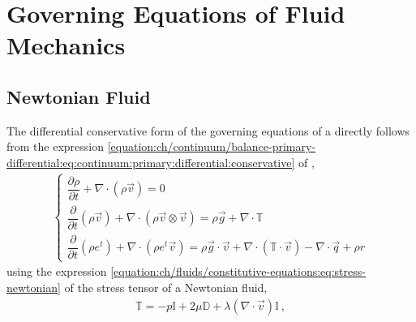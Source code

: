 \documentclass[letterpaper,10pt,english]{jupyterBook}
\begin{document}
\sphinxstepscope


\chapter{Governing Equations of Fluid Mechanics}
\label{\detokenize{ch/fluids/governing-equations:governing-equations-of-fluid-mechanics}}\label{\detokenize{ch/fluids/governing-equations:fluid-mechanics-governing-equations}}\label{\detokenize{ch/fluids/governing-equations::doc}}

\section{Newtonian Fluid}
\label{\detokenize{ch/fluids/governing-equations:newtonian-fluid}}
\sphinxAtStartPar
The differential conservative form of the governing equations of a {\hyperref[\detokenize{ch/fluids/constitutive-equations:fluid-mechanics-constutive-equations-newtonian}]{}} directly follows from the expression \eqref{equation:ch/continuum/balance-primary-differential:eq:continuum:primary:differential:conservative} of {\hyperref[\detokenize{ch/continuum/balance-derived-differential:continuum-governing-equations-primary-integral}]{}},
\begin{equation*}
\begin{split}\begin{cases}
  \dfrac{\partial \rho }{\partial t} + \nabla \cdot \left( \rho \vec{v} \right) = 0 \\
  \dfrac{\partial }{\partial t} \left( \rho \vec{v} \right) +  \nabla \cdot \left( \rho \vec{v} \otimes \vec{v} \right) = \rho \vec{g} + \nabla \cdot \mathbb{T} \\
  \dfrac{\partial}{\partial t}  \left( \rho e^t \right) + \nabla \cdot \left( \rho e^t \vec{v} \right) = \rho \vec{g} \cdot \vec{v} + \nabla \cdot \left( \mathbb{T} \cdot \vec{v} \right) - \nabla \cdot \vec{q} + \rho r
\end{cases}\end{split}
\end{equation*}
\sphinxAtStartPar
using the expression \eqref{equation:ch/fluids/constitutive-equations:eq:stress-newtonian} of the stress tensor of a Newtonian fluid,
\begin{equation*}
\begin{split}\mathbb{T} = - p \mathbb{I} + 2 \mu \mathbb{D} + \lambda (\nabla \cdot \vec{v}) \mathbb{I} \ ,\end{split}
\end{equation*}
\end{document}
